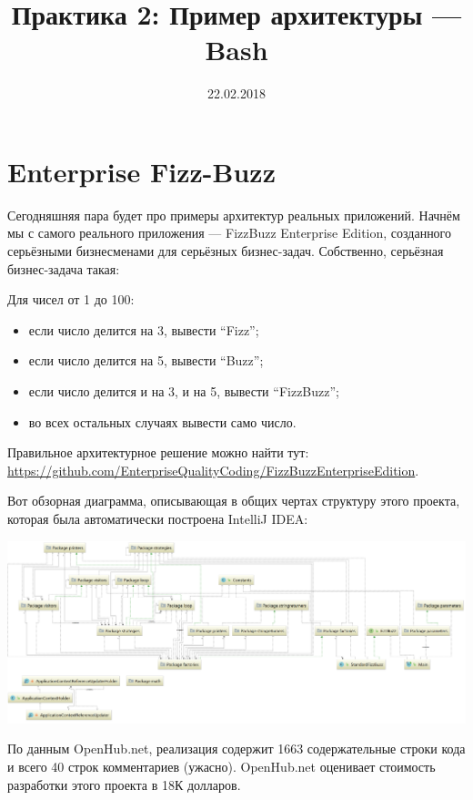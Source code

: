 \documentclass[a5paper]{article}
\title{Практика 2: Пример архитектуры --- Bash}
\date{22.02.2018}
\begin{document}
\maketitle
\thispagestyle{empty}

\section{Enterprise Fizz-Buzz}

Сегодняшняя пара будет про примеры архитектур реальных приложений. Начнём мы с самого реального приложения --- FizzBuzz Enterprise Edition, созданного серьёзными бизнесменами для серьёзных бизнес-задач. Собственно, серьёзная бизнес-задача такая:

Для чисел от 1 до 100:
\begin{itemize}
	\item если число делится на 3, вывести ``Fizz'';
	\item если число делится на 5, вывести ``Buzz'';
	\item если число делится и на 3, и на 5, вывести ``FizzBuzz'';
	\item во всех остальных случаях вывести само число.
\end{itemize}

Правильное архитектурное решение можно найти тут: \url{https://github.com/EnterpriseQualityCoding/FizzBuzzEnterpriseEdition}.

Вот обзорная диаграмма, описывающая в общих чертах структуру этого проекта, которая была автоматически построена IntelliJ IDEA:

\begin{center}
	\includegraphics[width=\textwidth]{fizzBuzzArchitecture.png}
\end{center}

По данным OpenHub.net, реализация содержит 1663 содержательные строки кода и всего 40 строк комментариев (ужасно). OpenHub.net оценивает стоимость разработки этого проекта в 18К долларов.
\end{document}
